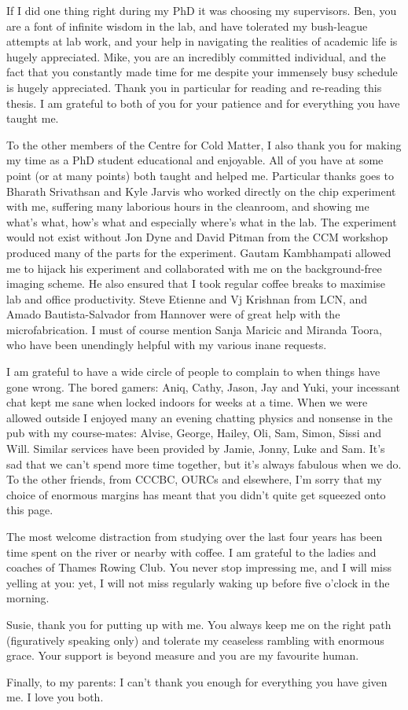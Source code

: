 \begin{singlespace}
If I did one thing right during my PhD it was choosing my supervisors. Ben, you
are a font of infinite wisdom in the lab, and have tolerated my bush-league
attempts at lab work, and your help in navigating the realities of academic
life is hugely appreciated. Mike, you are an incredibly committed individual,
and the fact that you constantly made time for me despite your immensely busy
schedule is hugely appreciated. Thank you in particular for reading and re-reading
this thesis.  I am grateful to both of you for your patience and for
everything you have taught me.

To the other members of the Centre for Cold Matter, I also thank you for making
my time as a PhD student educational and enjoyable. All of you have at some
point (or at many points) both taught and helped me.
%
Particular thanks goes to Bharath Srivathsan and Kyle Jarvis who worked
directly on the chip experiment with me, suffering many laborious hours in the
cleanroom, and showing me what's what, how's what and especially where's what
in the lab.
%
The experiment would not exist without Jon Dyne and David Pitman from the CCM
workshop produced many of the parts for the experiment.
%
Gautam Kambhampati allowed me to hijack his experiment and collaborated with me
on the background-free imaging scheme. He also ensured that I took
regular coffee breaks to maximise lab and office productivity.
%
Steve Etienne and Vj Krishnan from LCN, and Amado Bautista-Salvador from
Hannover were of great help with the microfabrication.
%
I must of course mention Sanja Maricic and Miranda Toora, who have been
unendingly helpful with my various inane requests.

I am grateful to have a wide circle of people to complain to when things have
gone wrong. The bored gamers: Aniq, Cathy, Jason, Jay and Yuki, your incessant
chat kept me sane when locked indoors for weeks at a time. When we were allowed
outside I enjoyed many an evening chatting physics and nonsense in the pub with
my course-mates: Alvise, George, Hailey, Oli, Sam, Simon, Sissi and Will. 
%
Similar services have been provided by Jamie, Jonny, Luke and Sam. It's sad
that we can't spend more time together, but it's always fabulous when we do. To
the other friends, from CCCBC, OURCs and elsewhere, I'm sorry that my choice of
enormous margins has meant that you didn't quite get squeezed onto this page.

The most welcome distraction from studying over the last four years has been
time spent on the river or nearby with coffee. I am grateful to the ladies and
coaches of Thames Rowing Club. You never stop impressing me, and I will miss
yelling at you: yet, I will not miss regularly waking up before five o'clock in the
morning.

Susie, thank you for putting up with me. You always keep me on the right path
(figuratively speaking only) and tolerate my ceaseless rambling with enormous
grace. Your support is beyond measure and you are my favourite human.

Finally, to my parents: I can't thank you enough for everything you have given
me. I love you both.

\end{singlespace}
